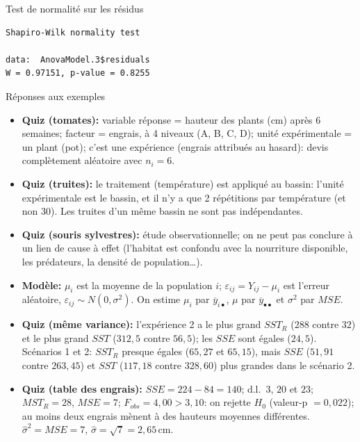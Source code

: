 \documentclass{BeamerTemplate}
\begin{document}
\begin{frame}[fragile,t]{Test de normalité sur les résidus}

\vspace{1cm}
\begin{Verbatim}[fontsize=\small]
        Shapiro-Wilk normality test

data:  AnovaModel.3$residuals
W = 0.97151, p-value = 0.8255
\end{Verbatim}

\bigskip
{}

\end{frame}

\begin{frame}[t]{Réponses aux exemples}

\scriptsize
\begin{itemize}\itemsep1mm
  \item \textbf{Quiz (tomates):} variable réponse = hauteur des plants (cm) après
  6 semaines; facteur = engrais, à 4 niveaux (A, B, C, D); unité expérimentale = un
  plant (pot); c'est une \alert{expérience} (engrais attribués au hasard): devis
  complètement aléatoire avec $n_i=6$.
  \item \textbf{Quiz (truites):} le traitement (température) est appliqué au
  \alert{bassin}: l'unité expérimentale est le bassin, et il n'y a que \alert{2
  répétitions} par température (et non 30). Les truites d'un même bassin ne sont pas
  indépendantes.
  \item \textbf{Quiz (souris sylvestres):} étude observationnelle; on ne peut pas
  conclure à un lien de cause à effet (l'habitat est confondu avec la nourriture
  disponible, les prédateurs, la densité de population\ldots).
  \item \textbf{Modèle:} $\mu_i$ est la moyenne de la population $i$;
  $\varepsilon_{ij}=Y_{ij}-\mu_i$ est l'erreur aléatoire, $\varepsilon_{ij}\sim N(0,\sigma^2)$.
  On estime $\mu_i$ par $\overline{y}_{i\bullet}$, $\mu$ par $\overline{y}_{\bullet\bullet}$
  et $\sigma^2$ par $MSE$.
  \item \textbf{Quiz (même variance):} l'expérience 2 a le plus grand $SST_R$
  ($288$ contre $32$) et le plus grand $SST$ ($312{,}5$ contre $56{,}5$); les $SSE$ sont
  égales ($24{,}5$). Scénarios 1 et 2: $SST_R$ presque égales ($65{,}27$ et $65{,}15$),
  mais $SSE$ ($51{,}91$ contre $263{,}45$) et $SST$ ($117{,}18$ contre $328{,}60$) plus
  grandes dans le scénario 2.
  \item \textbf{Quiz (table des engrais):} $SSE=224-84=140$; d.l.\ $3$, $20$ et $23$;
  $MST_R=28$, $MSE=7$; $F_{obs}=4{,}00>3{,}10$: on rejette $H_0$ (valeur-p $=0{,}022$);
  au moins deux engrais mènent à des hauteurs moyennes différentes.
  $\hat\sigma^2=MSE=7$, $\hat\sigma=\sqrt{7}=2{,}65$\,cm.
\end{itemize}

\end{frame}
\end{document}
